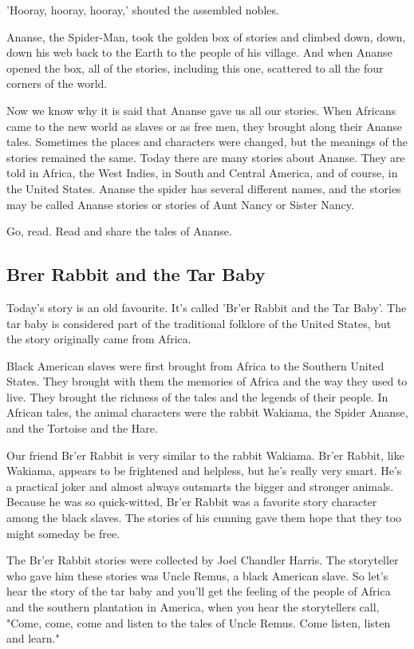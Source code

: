 'Hooray, hooray, hooray,' shouted the assembled nobles.

Ananse, the Spider-Man, took the golden box of stories and climbed down, down, down his web back to the Earth to the people of his village. And when Ananse opened the box, all of the stories, including this one, scattered to all the four corners of the world.

Now we know why it is said that Ananse gave us all our stories. When Africans came to the new world as slaves or as free men, they brought along their Ananse tales. Sometimes the places and characters were changed, but the meanings of the stories remained the same. Today there are many stories about Ananse. They are told in Africa, the West Indies, in South and Central America, and of course, in the United States. Ananse the spider has several different names, and the stories may be called Ananse stories or stories of Aunt Nancy or Sister Nancy.

Go, read. Read and share the tales of Ananse.

\subsection{Brer Rabbit and the Tar Baby}

Today's story is an old favourite. It's called 'Br'er Rabbit and the Tar Baby'. The tar baby is considered part of the traditional folklore of the United States, but the story originally came from Africa.

Black American slaves were first brought from Africa to the Southern United States. They brought with them the memories of Africa and the way they used to live. They brought the richness of the tales and the legends of their people. In African tales, the animal characters were the rabbit Wakiama, the Spider Ananse, and the Tortoise and the Hare.

Our friend Br'er Rabbit is very similar to the rabbit Wakiama. Br'er Rabbit, like Wakiama, appears to be frightened and helpless, but he's really very smart. He's a practical joker and almost always outsmarts the bigger and stronger animals. Because he was so quick-witted, Br'er Rabbit was a favorite story character among the black slaves. The stories of his cunning gave them hope that they too might someday be free.

The Br'er Rabbit stories were collected by Joel Chandler Harris. The storyteller who gave him these stories was Uncle Remus, a black American slave. So let's hear the story of the tar baby and you'll get the feeling of the people of Africa and the southern plantation in America, when you hear the storytellers call, "Come, come, come and listen to the tales of Uncle Remus. Come listen, listen and learn."

